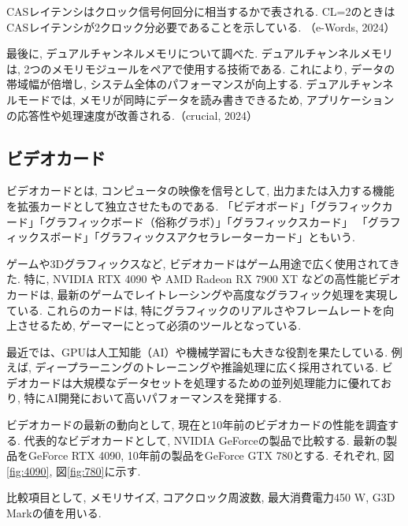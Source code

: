 \documentclass{ltjsarticle} %
\begin{document}
CASレイテンシはクロック信号何回分に相当するかで表される. 
CL=2のときはCASレイテンシが2クロック分必要であることを示している. 
（e-Words, 2024）

\vspace{0.5cm}

最後に, デュアルチャンネルメモリについて調べた. 
デュアルチャンネルメモリは, 2つのメモリモジュールをペアで使用する技術である. これにより, データの帯域幅が倍増し, 
システム全体のパフォーマンスが向上する. デュアルチャンネルモードでは, メモリが同時にデータを読み書きできるため, 
アプリケーションの応答性や処理速度が改善される.（crucial, 2024）


\subsection{ビデオカード}

ビデオカードとは, コンピュータの映像を信号として, 出力または入力する機能を拡張カードとして独立させたものである.
「ビデオボード」「グラフィックカード」「グラフィックボード（俗称グラボ）」「グラフィックスカード」
「グラフィックスボード」「グラフィックスアクセラレーターカード」ともいう. 

\vspace{0.5cm}

ゲームや3Dグラフィックスなど, ビデオカードはゲーム用途で広く使用されてきた. 
特に, NVIDIA RTX 4090 や AMD Radeon RX 7900 XT などの高性能ビデオカードは, 
最新のゲームでレイトレーシングや高度なグラフィック処理を実現している. 
これらのカードは, 特にグラフィックのリアルさやフレームレートを向上させるため, ゲーマーにとって必須のツールとなっている.

\vspace{0.5cm}

最近では、GPUは人工知能（AI）や機械学習にも大きな役割を果たしている. 
例えば, ディープラーニングのトレーニングや推論処理に広く採用されている. 
ビデオカードは大規模なデータセットを処理するための並列処理能力に優れており, 特にAI開発において高いパフォーマンスを発揮する.

\vspace{0.5cm}

ビデオカードの最新の動向として, 現在と10年前のビデオカードの性能を調査する. 代表的なビデオカードとして, NVIDIA GeForceの製品で比較する.
最新の製品をGeForce RTX 4090, 10年前の製品をGeForce GTX 780とする. 
それぞれ, 図\ref{fig:4090}, 図\ref{fig:780}に示す.

\vspace{0.5cm}

比較項目として, メモリサイズ, コアクロック周波数, 最大消費電力450 W, G3D Markの値を用いる.
\end{document}
